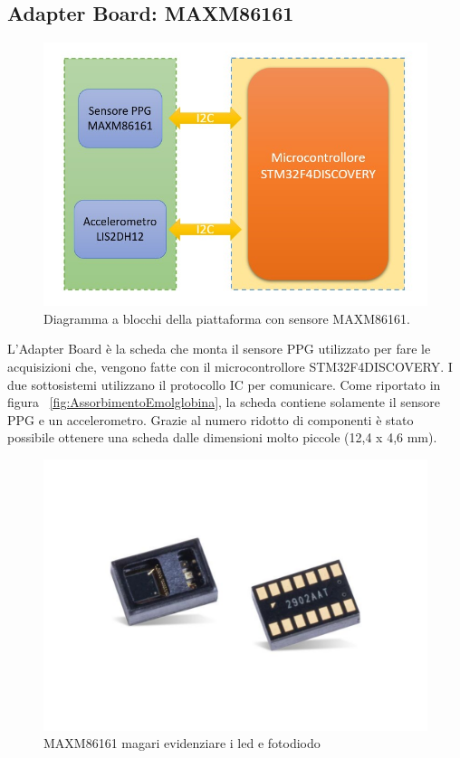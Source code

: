 \subsection{Adapter Board: MAXM86161}
\begin{figure}[h]
	\centering
	\includegraphics[width=0.8\linewidth]{ImageFiles/Hardware/diagramma_blocchi_MAXM}
	\caption{Diagramma a blocchi della piattaforma con sensore MAXM86161.}
	\label{fig:diagramma_blocchi_MAXM}
\end{figure} 
L'Adapter Board è la scheda che monta il sensore PPG utilizzato per fare le acquisizioni che, vengono fatte con il microcontrollore STM32F4DISCOVERY. I due sottosistemi utilizzano il protocollo IC per comunicare. Come riportato in figura \Fig~\ref{fig:AssorbimentoEmolglobina}, la scheda contiene solamente il sensore PPG e un accelerometro. Grazie al numero ridotto di componenti è stato possibile ottenere una scheda dalle dimensioni molto piccole (12,4 x 4,6 mm).
\begin{figure}[h]
	\centering
	\includegraphics[width=0.8\linewidth]{ImageFiles/Hardware/MAXM86161_Layout}
	\caption{MAXM86161 magari evidenziare i led e fotodiodo}
	\label{fig:xxxx}
\end{figure}
